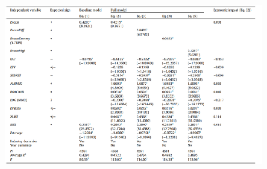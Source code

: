 \documentclass[12pt, a4paper]{article}
\begin{document}
			\begin{table}[htbp]
	\centering
	\resizebox{0.75\textheight}{!}{
		
		\label{tab:synchronicityt4}	
	}
\end{table}


	\begin{figure}
		\centering
		\includegraphics[width=0.9\linewidth]{t5}
		\label{fig:t5}
	\end{figure}

	\begin{table}[htbp]
		\centering
		\resizebox{0.75\textheight}{!}{
			
			\label{tab:synchronicityt5}	
		}
	\end{table}

	{		
	
	
}
\end{document}
